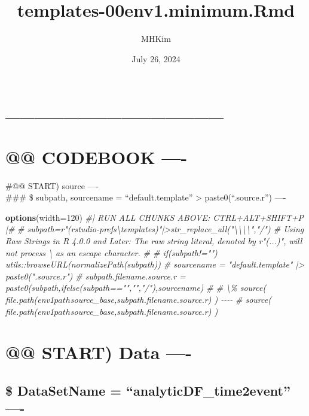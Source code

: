 \documentclass[
]{article}
\title{templates-00env1.minimum.Rmd}
\author{MHKim}
\date{July 26, 2024}
\newenvironment{Shaded}{\begin{snugshade}}{\end{snugshade}}
\newcommand{\AttributeTok}[1]{\textcolor[rgb]{0.13,0.29,0.53}{#1}}
\newcommand{\CommentTok}[1]{\textcolor[rgb]{0.56,0.35,0.01}{\textit{#1}}}
\newcommand{\DecValTok}[1]{\textcolor[rgb]{0.00,0.00,0.81}{#1}}
\newcommand{\FunctionTok}[1]{\textcolor[rgb]{0.13,0.29,0.53}{\textbf{#1}}}
\newcommand{\NormalTok}[1]{#1}
\begin{document}
\maketitle

{
\setcounter{tocdepth}{6}
\tableofcontents
}
\hypertarget{section}{%
\section{\_\_\_\_\_\_\_\_\_\_\_\_\_\_\_}\label{section}}

\hypertarget{codebook--}{%
\section{@@ CODEBOOK ----}\label{codebook--}}

\#@@ START) source ----\\
\#\#\# \$ subpath, sourcename = ``default.template''
\textbar\textgreater{} paste0(``.source.r'') ----

\begin{Shaded}
\begin{Highlighting}[]
\FunctionTok{options}\NormalTok{(}\AttributeTok{width=}\DecValTok{120}\NormalTok{)}
\CommentTok{\#| RUN ALL CHUNKS ABOVE: CTRL+ALT+SHIFT+P |\#}
\CommentTok{\# subpath=r"(rstudio{-}prefs\textbackslash{}templates)"|\textgreater{}str\_replace\_all("\textbackslash{}\textbackslash{}\textbackslash{}\textbackslash{}","/")  \# Using Raw Strings in R 4.0.0 and Later: The raw string literal, denoted by r"(...)", will not process \textbackslash{} as an escape character.}
\CommentTok{\# \# if(subpath!="") utils::browseURL(normalizePath(subpath))}
\CommentTok{\# sourcename = "default.template" |\textgreater{} paste0(".source.r")}
\CommentTok{\# subpath.filename.source.r = paste0(subpath,ifelse(subpath=="","","/"),sourcename)}
\CommentTok{\# \# \textbackslash{}\% source( file.path(env1$path$source\_base,subpath.filename.source.r) ) {-}{-}{-}{-}  }
\CommentTok{\# source( file.path(env1$path$source\_base,subpath.filename.source.r) )}
\end{Highlighting}
\end{Shaded}

\hypertarget{start-data--}{%
\section{@@ START) Data ----}\label{start-data--}}

\hypertarget{datasetname-analyticdf_time2event--}{%
\subsection{\$ DataSetName = ``analyticDF\_time2event''
----}\label{datasetname-analyticdf_time2event--}}
\end{document}
